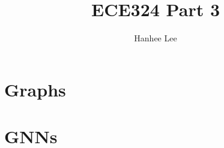 \documentclass{article}
\title{ECE324 Part 3}
\author{Hanhee Lee}
\begin{document}
\section{Graphs}

\newpage

\section{GNNs}

\end{document}
